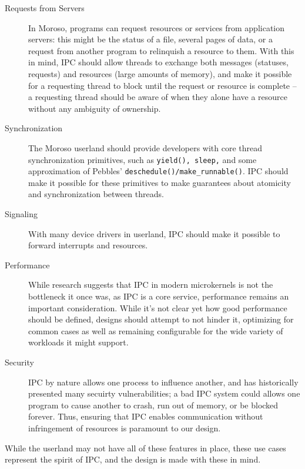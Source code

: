 \documentclass{article}
\begin{document}
\begin{description}
\item[Requests from Servers] 
In Moroso, programs can request resources or services from application servers: this might be the status of a file, several pages of data, or a request from another program to relinquish a resource to them.  With this in mind, IPC should allow threads to exchange both messages (statuses, requests) and resources (large amounts of memory), and make it possible for a requesting thread to block until the request or resource is complete -- a requesting thread should be aware of when they alone have a resource without any ambiguity of ownership.   

\item[Synchronization] The Moroso userland should provide developers with core thread synchronization primitives, such as \verb|yield(), sleep,| and some approximation of Pebbles' \verb|deschedule()/make_runnable()|.  IPC should make it possible for these primitives to make guarantees about atomicity and synchronization between threads.

\item[Signaling] With many device drivers in userland,  IPC should make it possible to forward interrupts and resources.
\item[Performance] While research suggests that IPC in modern microkernels is not the bottleneck it once was, as IPC is a core service, performance remains an important consideration. While it’s not clear yet how good performance should be defined, designs should attempt to not hinder it, optimizing for common cases as well as remaining configurable for the wide variety of workloads it might support.  

\item[Security] IPC by nature allows one process to influence another, and has historically presented many secuirty vulnerabilities; a bad IPC system could allows one program to cause another to crash, run out of memory, or be blocked forever.  Thus, ensuring that IPC enables communication without infringement of resources is paramount to our design.

\end{description}

While the userland may not have all of these features in place, these use cases represent the spirit of IPC, and the design is made with these in mind.
\end{document}

